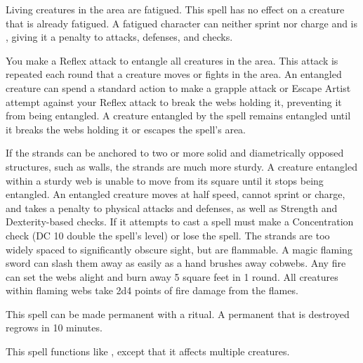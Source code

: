\spelldur{\durshort}
\spelleffect Living creatures in the area are fatigued. This spell has no effect on a creature that is already fatigued.
\spellnotes A fatigued character can neither sprint nor charge and is \vulnerable, giving it a  penalty to attacks, defenses, and checks.

\spelldur{\durshort \dismissable}
\spelleffect You make a Reflex attack to entangle all creatures in the area. This attack is repeated each round that a creature moves or fights in the area. An entangled creature can spend a standard action to make a grapple attack or Escape Artist attempt against your Reflex attack to break the webs holding it, preventing it from being entangled. A creature entangled by the spell remains entangled until it breaks the webs holding it or escapes the spell's area.
\par If the strands can be anchored to two or more solid and diametrically opposed structures, such as walls, the strands are much more sturdy. A creature entangled within a sturdy web is unable to move from its square until it stops being entangled.
\spellnotes An entangled creature moves at half speed, cannot sprint or charge, and takes a  penalty to physical attacks and defenses, as well as Strength and Dexterity-based checks. If it attempts to cast a spell must make a Concentration check (DC 10 \add double the spell's level) or lose the spell.
The strands are too widely spaced to significantly obscure sight, but are flammable. A magic flaming sword can slash them away as easily as a hand brushes away cobwebs. Any fire can set the webs alight and burn away 5 square feet in 1 round. All creatures within flaming webs take 2d4 points of fire damage from the flames.

This spell can be made permanent with a  ritual. A permanent  that is destroyed regrows in 10 minutes.

\spelleffect This spell functions like , except that it affects multiple creatures.

